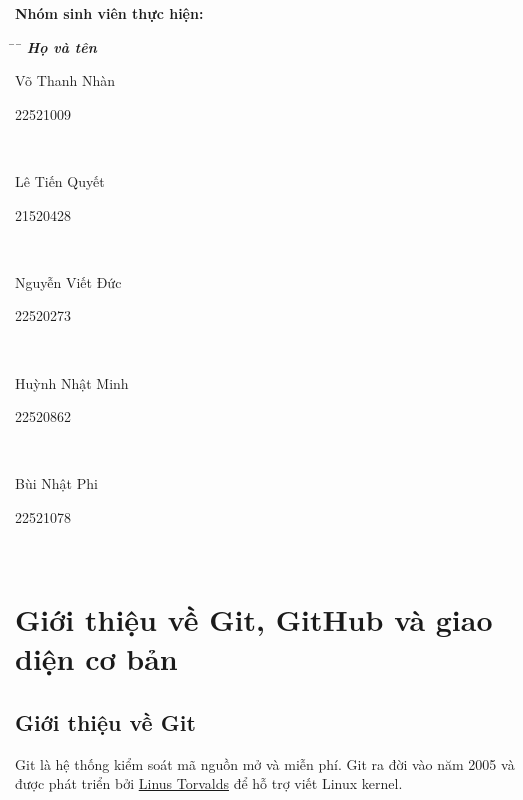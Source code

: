 \documentclass[a4paper]{report}
\begin{document}
\begin{titlepage}
\vspace{10pt}
\textbf{Nhóm sinh viên thực hiện:}
\begin{tabbing}
\hspace{9cm}\=\hspace{3cm}\=\ \kill
{\it \textbf{Họ và tên}}\>\\
\begin{bfseries}Võ Thanh Nhàn\end{bfseries}\> \begin{bfseries}22521009\end{bfseries}\\
\begin{bfseries}Lê Tiến Quyết\end{bfseries}\> \begin{bfseries}21520428\end{bfseries}\\
\begin{bfseries}Nguyễn Viết Đức\end{bfseries}\> \begin{bfseries}22520273\end{bfseries}\\
\begin{bfseries}Huỳnh Nhật Minh\end{bfseries}\> \begin{bfseries}22520862\end{bfseries}\\
\begin{bfseries}Bùi Nhật Phi\end{bfseries}\> \begin{bfseries}22521078\end{bfseries}\\
\end{tabbing}
\vspace{10pt}
\end{titlepage}
\newpage
\tableofcontents
\newpage
\chapter{Giới thiệu về Git, GitHub và giao diện cơ bản}
\section{Giới thiệu về Git}
\textrm{Git là hệ thống kiểm soát mã nguồn mở và miễn phí.}
\newline
\textrm{Git ra đời vào năm 2005 và được phát triển bởi \href{https://vi.wikipedia.org/wiki/Linus_Torvalds}{Linus Torvalds} để hỗ trợ viết Linux kernel.}
\end{document}
